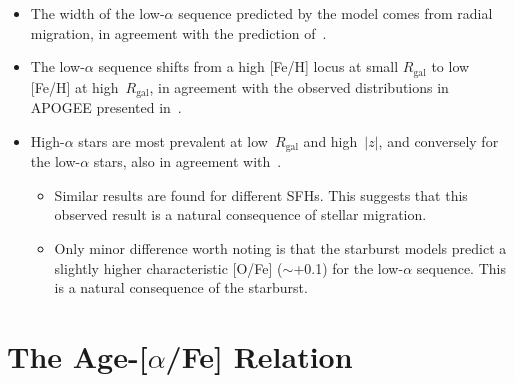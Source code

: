 \documentclass[a4paper, fleqn, usenatbib, useAMS]{mnras}
\begin{document}
\begin{itemize}
	\item The width of the low-$\alpha$ sequence predicted by the model comes 
	from radial migration, in agreement with the prediction 
	of~\citet{Schoenrich2009}. 

	\item The low-$\alpha$ sequence shifts from a high [Fe/H] locus at small 
	$R_\text{gal}$ to low [Fe/H] at high~$R_\text{gal}$, in agreement with the 
	observed distributions in APOGEE presented in~\citet{Hayden2015}. 

	\item High-$\alpha$ stars are most prevalent at low~$R_\text{gal}$ and 
	high~$\left|z\right|$, and conversely for the low-$\alpha$ stars, also 
	in agreement with~\citet{Hayden2015}. 
	\begin{itemize} 
		\item Similar results are found for different SFHs. This suggests that 
		this observed result is a natural consequence of stellar migration. 

		\item Only minor difference worth noting is that the starburst models 
		predict a slightly higher characteristic [O/Fe] ($\sim$+0.1) for the 
		low-$\alpha$ sequence. This is a natural consequence of the starburst. 
	\end{itemize} 
\end{itemize} 

\section{The Age-[$\alpha$/Fe] Relation} 
\label{sec:age_alpha} 
\end{document}

